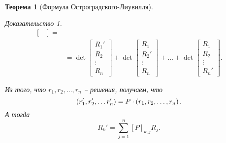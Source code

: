 \documentclass[a5paper, 10pt]{article}
\theoremstyle{definition}
\theoremstyle{plain}
\newtheorem{Th}{Теорема}
\theoremstyle{remark}
\newtheorem*{Proof}{Доказательство}
\begin{document}
\begin{Th}[Формула Остроградского-Лиувилля]
\begin{Proof}
\[\begin{split}
\begin{bmatrix}
	\end{bmatrix} = \\
			&=\det \begin{bmatrix}
				R_1'\\R_2\\\vdots\\R_n
			\end{bmatrix}
			+ 
			\det \begin{bmatrix}
				R_1\\R_2'\\\vdots\\R_n
			\end{bmatrix}
			+ 
			\dots +
		\det \begin{bmatrix}
			R_1\\R_2\\\vdots\\R_n'
		\end{bmatrix}.
	\end{split}
			\]
			
			Из того, что $r_1, r_2, \dots, r_n$ -- решения, получаем, что \[\left(r_1', r_2', \dots r_n'\right) = P \cdot \left(r_1, r_2, \dots, r_n\right).\]
			А тогда 
			\[
			R_k' = \sum\limits_{j=1}^n [P]_{k,j} R_j.
			\]
			

\end{Proof}
\end{Th}
\end{document}
